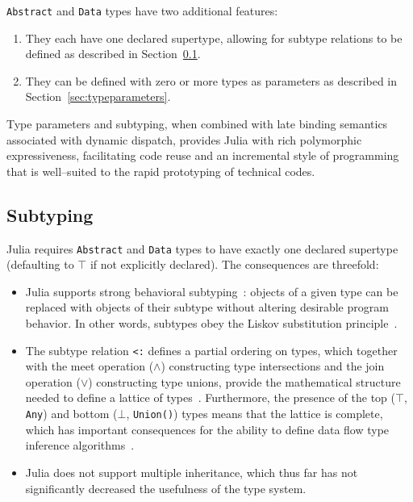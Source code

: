 \documentclass[pldi]{sigplanconf-pldi15}
\begin{document}
\verb|Abstract| and \verb|Data| types have two additional features:

\begin{enumerate}
	\item They each have one declared supertype, allowing for subtype
	relations to be defined as described in Section~\ref{sec:subtyping}.

	\item They can be defined with zero or more types as parameters as
	described in Section~\ref{sec:typeparameters}.
\end{enumerate}

Type parameters and subtyping, when combined with late binding semantics
associated with dynamic dispatch, provides Julia with rich polymorphic
expressiveness, facilitating code reuse and an incremental style of
programming~\cite{Castagna1997} that is well--suited to the rapid prototyping
of technical codes.

\subsection{Subtyping}
\label{sec:subtyping}

Julia requires \verb|Abstract| and \verb|Data| types to have exactly one
declared supertype (defaulting to $\top$ if not explicitly declared). The
consequences are threefold:

\begin{itemize}

	\item Julia supports strong behavioral subtyping~\cite{Liskov1994}:
		objects of a given type can be replaced with objects of their
		subtype without altering desirable program behavior. In other
		words, subtypes obey the Liskov substitution
		principle~\cite{Liskov1974}.

	\item The subtype relation \verb|<:| defines a partial ordering on types,
		which together with the meet operation ($\wedge$) constructing
		type intersections and the join operation ($\vee$) constructing
		type unions, provide the mathematical structure needed to
		define a lattice of types~\cite{Scott1976}. Furthermore, the 
		presence of the top ($\top$, \verb|Any|) and bottom ($\bot$,
		\verb|Union()|) types means that the lattice is complete, which
		has important consequences for the ability to define data flow
		type inference algorithms~\cite{Kam1977,Khedker2009}.

	\item Julia does not support multiple inheritance, which thus far has
		not significantly decreased the usefulness of the type system.

\end{itemize}
\end{document}
